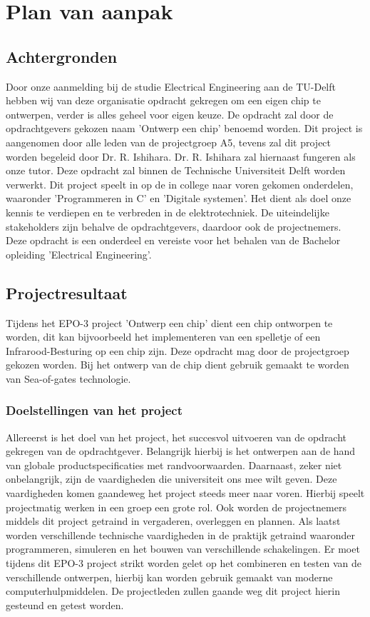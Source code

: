 \documentclass[oneside,dutch]{tudelft-report}
\begin{document}
\appendix

\chapter{Plan van aanpak}
\section{Achtergronden}
Door onze aanmelding bij de studie Electrical Engineering aan de TU-Delft hebben wij van deze organisatie opdracht gekregen om een eigen chip te ontwerpen, verder is alles geheel voor eigen keuze. De opdracht zal door de opdrachtgevers gekozen naam 'Ontwerp een chip' benoemd worden. Dit project is aangenomen door alle leden van de projectgroep A5, tevens zal dit project worden begeleid door Dr. R. Ishihara. Dr. R. Ishihara zal hiernaast fungeren als onze tutor. Deze opdracht zal binnen de Technische Universiteit Delft worden verwerkt. Dit project speelt in op de in college naar voren gekomen onderdelen, waaronder 'Programmeren in C' en 'Digitale systemen'. Het dient als doel onze kennis te verdiepen en te verbreden in de elektrotechniek. De uiteindelijke stakeholders zijn behalve de opdrachtgevers, daardoor ook de projectnemers. Deze opdracht is een onderdeel en vereiste voor het behalen van de Bachelor opleiding 'Electrical Engineering'.

\section{Projectresultaat}
Tijdens het EPO-3 project 'Ontwerp een chip' dient een chip ontworpen te worden, dit kan bijvoorbeeld het implementeren van een spelletje of een Infrarood-Besturing op een chip zijn. Deze opdracht mag door de projectgroep gekozen worden. Bij het ontwerp van de chip dient gebruik gemaakt te worden van Sea-of-gates technologie.

\subsection{Doelstellingen van het project}
Allereerst is het doel van het project, het succesvol uitvoeren van de opdracht gekregen van de opdrachtgever. Belangrijk hierbij is het ontwerpen aan de hand van globale productspecificaties met randvoorwaarden. Daarnaast, zeker niet onbelangrijk, zijn de vaardigheden die universiteit ons mee wilt geven. Deze vaardigheden komen gaandeweg het project steeds meer naar voren.  Hierbij speelt projectmatig werken in een groep een grote rol. Ook worden de projectnemers middels dit project getraind in vergaderen, overleggen en plannen. Als laatst worden verschillende technische vaardigheden in de praktijk getraind waaronder programmeren, simuleren en het bouwen van verschillende schakelingen. Er moet tijdens dit EPO-3 project strikt worden gelet op het combineren en testen van de verschillende ontwerpen, hierbij kan worden gebruik gemaakt van moderne computerhulpmiddelen. De projectleden zullen gaande weg dit project hierin gesteund en getest worden.  
\end{document}
